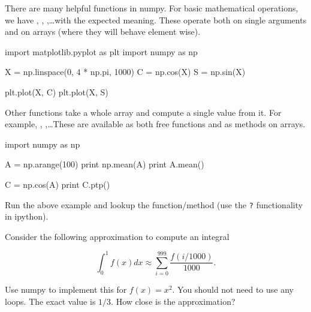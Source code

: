 There are many helpful functions in numpy. For basic mathematical operations, we have , , ,\ldots with the expected meaning. These operate both on single arguments and on arrays (where they will behave element wise).

\begin{python}
import matplotlib.pyplot as plt
import numpy as np

X = np.linspace(0, 4 * np.pi, 1000)
C = np.cos(X)
S = np.sin(X)

plt.plot(X, C)
plt.plot(X, S)
\end{python}

Other functions take a whole array and compute a single value from it. For example, , ,\ldots These are available as both free functions and as methods on arrays.

\begin{python}
import numpy as np

A = np.arange(100)
print np.mean(A)
print A.mean()

C = np.cos(A)
print C.ptp()
\end{python}

\begin{exercise}
Run the above example and lookup the  function/method (use the \texttt{?} functionality in ipython).
\end{exercise}


\begin{exercise}
Consider the following approximation to compute an integral

\[
\int_0^{1} f(x)dx \approx \sum_{i = 0}^{999} \frac{f(i/1000)}{1000}.
\]

Use numpy to implement this for $f(x) = x^2$. You should not need to use any loops. The exact value is $1/3$. How close is the approximation?
\end{exercise}



